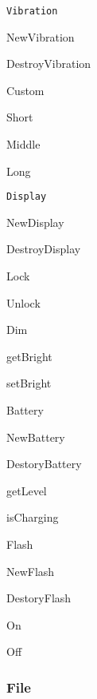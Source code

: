 \begin{DoxyItemize}
\item {\tt Vibration}
\begin{DoxyItemize}
\item New\-Vibration
\item Destroy\-Vibration
\item Custom
\item Short
\item Middle
\item Long
\end{DoxyItemize}
\item {\tt Display}
\begin{DoxyItemize}
\item New\-Display
\item Destroy\-Display
\item Lock
\item Unlock
\item Dim
\item get\-Bright
\item set\-Bright
\end{DoxyItemize}
\item Battery
\begin{DoxyItemize}
\item New\-Battery
\item Destory\-Battery
\item get\-Level
\item is\-Charging
\end{DoxyItemize}
\item Flash
\begin{DoxyItemize}
\item New\-Flash
\item Destory\-Flash
\item On
\item Off
\end{DoxyItemize}
\end{DoxyItemize}

\subsubsection*{File}


